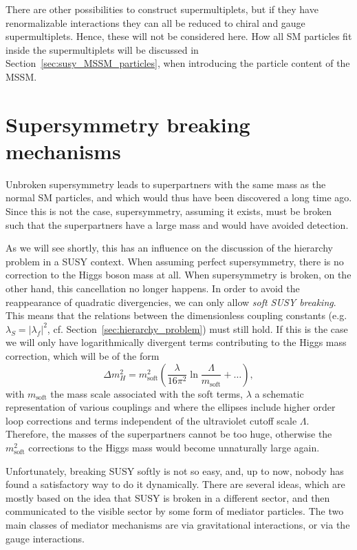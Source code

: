There are other possibilities to construct supermultiplets, but if they have renormalizable
interactions they can all be reduced to chiral and gauge supermultiplets. Hence, these will not be
considered here. 
How all SM particles fit inside the supermultiplets will be discussed in
Section~\ref{sec:susy_MSSM_particles}, when introducing the particle content of the MSSM. 


\section{Supersymmetry breaking mechanisms \label{sec:susy_breaking}}

Unbroken supersymmetry leads to superpartners with the same mass as the normal SM particles, and
which would thus have been discovered a long time ago. Since this is not the case,
supersymmetry, assuming it exists, must be broken such that the superpartners have a large mass
and would have avoided detection. 

As we will see shortly, this has an influence on the discussion of the hierarchy problem in a SUSY
context. 
When assuming perfect supersymmetry, there is no correction to the Higgs boson mass at all. When
supersymmetry is broken, on the other hand, this cancellation no longer happens.
In order to avoid the reappearance of quadratic divergencies, we can only allow \textit{soft SUSY
breaking}. 
This means that the relations between the dimensionless coupling constants (e.g. $\lambda_S =
|\lambda_f|^2$, cf. Section~\ref{sec:hierarchy_problem}) must still hold. 
If this is the case we will only have logarithmically divergent terms contributing to the Higgs mass
correction, which will be of the form
\begin{equation}
  \Delta m_H^2 = m_{\text{soft}}^2 \left(\frac{\lambda}{16 \pi^2}
\ln{\frac{\Lambda}{m_{\text{soft}}} + \ldots}\right) ,
\end{equation}
with $m_{\text{soft}}$ the mass scale associated with the soft terms, $\lambda$ a schematic
representation of various couplings and where the ellipses include higher order loop corrections and
terms independent of the ultraviolet cutoff scale $\Lambda$. 
Therefore, the masses of the superpartners cannot be too huge, otherwise the $m_{\text{soft}}^2$
corrections to the Higgs mass would become unnaturally large again. 

Unfortunately, breaking SUSY softly is not so easy, and, up to now, nobody has found a
satisfactory way to do it dynamically. There are several ideas, which are mostly based on the idea
that SUSY is broken in a different sector, and then communicated to the visible sector by some form
of mediator particles. The two main classes of mediator mechanisms are via gravitational
interactions, or via the gauge interactions. 

